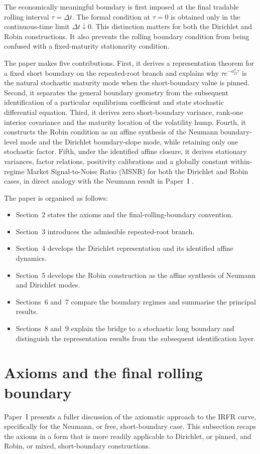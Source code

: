 \documentclass[12pt]{article}
\numberwithin{equation}{subsection}
\begin{document}
The economically meaningful boundary is first imposed at the final tradable rolling interval $\tau=\Delta t$. The formal condition at $\tau=0$ is obtained only in the continuous-time limit $\Delta t\downarrow0$. This distinction matters for both the Dirichlet and Robin constructions. It also prevents the rolling boundary condition from being confused with a fixed-maturity stationarity condition.

The paper makes five contributions. First, it derives a representation theorem for a fixed short boundary on the repeated-root branch and explains why $\tau e^{-a_D^2\tau}$ is the natural stochastic maturity mode when the short-boundary value is pinned. Second, it separates the general boundary geometry from the subsequent identification of a particular equilibrium coefficient and state stochastic differential equation. Third, it derives zero short-boundary variance, rank-one interior covariance and the maturity location of the volatility hump. Fourth, it constructs the Robin condition as an affine synthesis of the Neumann boundary-level mode and the Dirichlet boundary-slope mode, while retaining only one stochastic factor. Fifth, under the identified affine closure, it derives stationary variances, factor relations, positivity calibrations and a globally constant within-regime Market Signal-to-Noise Ratio (MSNR) for both the Dirichlet and Robin cases, in direct analogy with the Neumann result in Paper~I \cite{Oza2026}.

The paper is organised as follows: \begin{itemize} 
\item Section~2 states the axioms and the final-rolling-boundary convention. \item Section~3 introduces the admissible repeated-root branch. 
\item Section~4 develops the Dirichlet representation and its identified affine dynamics. 
\item Section~5 develops the Robin construction as the affine synthesis of Neumann and Dirichlet modes. 
\item Sections~6 and~7 compare the boundary regimes and summarise the principal results. 
\item Sections~8 and~9 explain the bridge to a stochastic long boundary and distinguish the representation results from the subsequent identification layer.
\end{itemize}

\section{Axioms and the final rolling boundary}
Paper~I \cite{Oza2026} presents a fuller discussion of the axiomatic approach to the IRFR curve, specifically for the Neumann, or free, short-boundary case. This subsection recaps the axioms in a form that is more readily applicable to Dirichlet, or pinned, and Robin, or mixed, short-boundary constructions.
\end{document}
